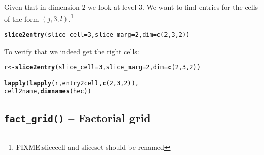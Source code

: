 \documentclass[10pt]{article}\usepackage[]{graphicx}\usepackage[]{xcolor}
\makeatletter
\newcommand{\hlnum}[1]{\textcolor[rgb]{0.686,0.059,0.569}{#1}}%
\newcommand{\hlstd}[1]{\textcolor[rgb]{0.345,0.345,0.345}{#1}}%
\newcommand{\hlkwb}[1]{\textcolor[rgb]{0.69,0.353,0.396}{#1}}%
\newcommand{\hlkwc}[1]{\textcolor[rgb]{0.333,0.667,0.333}{#1}}%
\newcommand{\hlkwd}[1]{\textcolor[rgb]{0.737,0.353,0.396}{\textbf{#1}}}%
\newenvironment{kframe}{%
 \def\at@end@of@kframe{}%
 \ifinner\ifhmode%
  \def\at@end@of@kframe{\end{minipage}}%
  \begin{minipage}{\columnwidth}%
 \fi\fi%
 \def\FrameCommand##1{\hskip\@totalleftmargin \hskip-\fboxsep
 \colorbox{shadecolor}{##1}\hskip-\fboxsep
     \hskip-\linewidth \hskip-\@totalleftmargin \hskip\columnwidth}%
 \MakeFramed {\advance\hsize-\width
   \@totalleftmargin\z@ \linewidth\hsize
   \@setminipage}}%
 {\par\unskip\endMakeFramed%
 \at@end@of@kframe}
\newenvironment{knitrout}{}{} %
\def\code#1{\texttt{#1}}
\makeatother
\begin{document}
Given that in dimension $2$ we look at level $3$. We want to find
entries for the cells of the form $(j,3,l)$.\footnote{FIXME:slicecell and
  sliceset should be renamed}
\begin{knitrout}\small
{}\color{fgcolor}\begin{kframe}
\begin{alltt}
\hlkwd{slice2entry}\hlstd{(}\hlkwc{slice_cell}\hlstd{=}\hlnum{3}\hlstd{,} \hlkwc{slice_marg}\hlstd{=}\hlnum{2}\hlstd{,} \hlkwc{dim}\hlstd{=}\hlkwd{c}\hlstd{(} \hlnum{2}\hlstd{,} \hlnum{3}\hlstd{,} \hlnum{2} \hlstd{))}
\end{alltt}


{\ttfamily\noindent\bfseries{}}\end{kframe}
\end{knitrout}

To verify that we indeed get the right cells:

\begin{knitrout}\small
{}\color{fgcolor}\begin{kframe}
\begin{alltt}
\hlstd{r} \hlkwb{<-} \hlkwd{slice2entry}\hlstd{(}\hlkwc{slice_cell}\hlstd{=}\hlnum{3}\hlstd{,} \hlkwc{slice_marg}\hlstd{=}\hlnum{2}\hlstd{,} \hlkwc{dim}\hlstd{=}\hlkwd{c}\hlstd{(} \hlnum{2}\hlstd{,} \hlnum{3}\hlstd{,} \hlnum{2} \hlstd{))}
\end{alltt}


{\ttfamily\noindent\bfseries{}}\begin{alltt}
\hlkwd{lapply}\hlstd{(}\hlkwd{lapply}\hlstd{(r, entry2cell,} \hlkwd{c}\hlstd{(} \hlnum{2}\hlstd{,} \hlnum{3}\hlstd{,} \hlnum{2} \hlstd{)),}
       \hlstd{cell2name,} \hlkwd{dimnames}\hlstd{(hec))}
\end{alltt}


{\ttfamily\noindent\bfseries\color{errorcolor}{\#\# Error in eval(expr, envir, enclos): object 'entry2cell' not found}}\end{kframe}
\end{knitrout}




\subsection{\code{fact\_grid()} -- Factorial grid}
\label{sec:factgrid}
\end{document}
